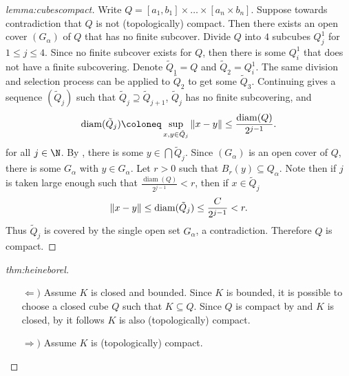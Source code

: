\documentclass[../main.tex]{subfiles}
\begin{document}
\begin{proof}[lemma:cubescompact]
    Write $Q = [a_1, b_1] \times \ldots \times [a_n \times b_n]$. Suppose towards contradiction that $Q$ is not (topologically) compact. Then there exists an open cover $(G_{\alpha})$ of $Q$ that has no finite subcover. Divide $Q$ into $4$ subcubes $Q^{1}_{j}$ for $1 \leq j \leq 4$. Since no finite subcover exists for $Q$, then there is some $Q^{1}_{i}$ that does not have a finite subcovering. Denote $\tilde{Q}_1 = Q$ and $\tilde{Q}_2 = Q^{1}_i$. The same division and selection process can be applied to $\tilde{Q}_2$ to get some $\tilde{Q}_3$. Continuing gives a sequence $(\tilde{Q}_j)$ such that $\tilde{Q}_j \supseteq \tilde{Q}_{j+1}$, $\tilde{Q}_j$ has no finite subcovering, and
    \[
        \operatorname{diam}(\tilde{Q}_j) \coloneq \sup_{x,y \in \tilde{Q}_j} \norm{x - y} \leq \frac{\operatorname{diam}(Q)}{2^{j-1}}
    .\]
    for all $j \in \N$. By , there is some $y \in \bigcap \tilde{Q}_j$. Since $(G_{\alpha})$ is an open cover of $Q$, there is some $G_{\alpha}$ with $y \in G_{\alpha}$. Let $r > 0$ such that $B_r(y) \subseteq Q_{\alpha}$. Note then if $j$ is taken large enough such that $\frac{\operatorname{diam}(Q)}{2^{j-1}} < r$, then if $x \in \tilde{Q}_j$
    \[
        \norm{x - y} \leq \operatorname{diam}(\tilde{Q}_j) \leq \frac{C}{2^{j-1}} < r
    .\]
    Thus $\tilde{Q}_j$ is covered by the single open set $G_{\alpha}$, a contradiction. Therefore $Q$ is compact.
\end{proof}

\begin{proof}[thm:heineborel]
    \begin{enumerate}
        \item[$\Leftarrow)$]
            Assume $K$ is closed and bounded. Since $K$ is bounded, it is possible to choose a closed cube $Q$ such that $K \subseteq Q$. Since $Q$ is compact by  and $K$ is closed, by  it follows $K$ is also (topologically) compact.
        \item[$\Rightarrow)$]
            Assume $K$ is (topologically) compact.
    \end{enumerate}
\end{proof}
\end{document}
